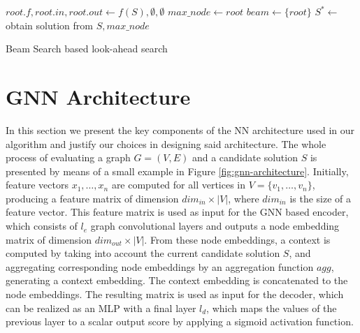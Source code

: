 \documentclass[draft,final]{vutinfth} %
\begin{document}
\begin{algorithm}
    \DontPrintSemicolon
    $root.f, root.in, root.out \gets f(S), \emptyset, \emptyset$ \;
    $max\_node \gets root$ \;
    $beam \gets \{root\}$ \;
    $S^* \gets$ obtain solution from $S, max\_node$ \;
    \caption{Beam Search based look-ahead search}
    \label{alg:lookahead-beam-search}
\end{algorithm}

\section{GNN Architecture}\label{sec:gnn-architecture}
In this section we present the key components of the NN architecture used in our algorithm and justify our choices in designing said architecture. 
The whole process of evaluating a graph $G = (V, E)$ and a candidate solution $S$ is presented by means of a small example in Figure \ref{fig:gnn-architecture}. 
Initially, feature vectors $x_1, \dots, x_n$ are computed for all vertices in $V = \{v_1, \dots, v_n\}$, producing a feature matrix of dimension $\mathit{dim_{in}} \times |V|$, where $\mathit{dim_{in}}$ is the size of a feature vector. This feature matrix is used as input for the GNN based encoder, which consists of $l_e$ graph convolutional layers and outputs a node embedding matrix of dimension $\mathit{dim_{out}} \times |V|$. From these node embeddings, a context is computed by taking into account the current candidate solution $S$, and aggregating corresponding node embeddings by an aggregation function $\mathit{agg}$, generating a context embedding. The context embedding is concatenated to the node embeddings. The resulting matrix is used as input for the decoder, which can be realized as an MLP with a final layer $l_d$, which maps the values of the previous layer to a scalar output score by applying a sigmoid activation function. 
\end{document}
